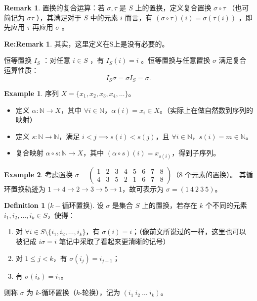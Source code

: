 \documentclass[oneside]{book}
\theoremstyle{definition}
\newtheorem{example}{Example}[section]
\newtheorem{definition}{Definition}[section]
\newtheorem{remark}{Remark}[section]
\newtheorem{reremark}{Re:Remark}[section]
\begin{document}
	\begin{remark}
		置换的复合运算：若 \( \sigma, \tau \) 是 \( S \) 上的置换，定义复合置换 \( \sigma \circ \tau \) （也可简记为 \( \sigma\tau \) ），其满足对于 \( S \) 中的元素 \( i \) 而言，有 \( (\sigma \circ \tau)(i) = \sigma(\tau(i)) \) ，即先应用 \( \tau \) 再应用 \( \sigma \)  。  
		
	\begin{reremark}
		其实，这里定义在S上是没有必要的。
	\end{reremark}
		恒等置换 \( I_S \) ：对任意 \( i \in S \) ，有 \( I_S(i) = i \) 。恒等置换与任意置换 \( \sigma \) 满足复合运算性质：  
		\[
		I_S \sigma = \sigma I_S = \sigma.
		\]  
	\end{remark}
	\begin{example}
		序列 \( X = \{ x_1, x_2, x_3, x_4, \dots \} \)。
		\begin{itemize}
			\item 定义 \( \alpha: \mathbb{N} \to X \)，其中 \( \forall i \in \mathbb{N} \)，\( \alpha(i) = x_i \in X \)。（实际上在做自然数到序列的映射）
			\item 定义 \( s: \mathbb{N} \to \mathbb{N} \)，满足 \( i < j \implies s(i) < s(j) \)，且 \( \forall i \in \mathbb{N} \)，\( s(i) = m \in \mathbb{N} \)。
			\item 复合映射 \( \alpha \circ s: \mathbb{N} \to X \)，其中 \( (\alpha \circ s)(i) = x_{s(i)} \)，得到子序列。
		\end{itemize}
	\end{example}
	
	\begin{example}
		考虑置换 \( \sigma = \begin{pmatrix} 1 & 2 & 3 & 4 & 5 & 6 & 7 & 8 \\ 4 & 3 & 5 & 2 & 1 & 6 & 7 & 8 \end{pmatrix} \)（8 个元素的置换）。
		其循环置换轨迹为 \( 1 \to 4 \to 2 \to 3 \to 5 \to 1 \)，故可表示为 \( \sigma = (1\ 4\ 2\ 3\ 5) \)。
	\end{example}
	
	\begin{definition}[$k-$循环置换]
		设 \( \sigma \) 是集合 \( S \) 上的置换，若存在 \( k \) 个不同的元素 \( i_1, i_2, \dots, i_k \in S \)，使得：
		\begin{enumerate}
			\item 对 \( \forall i \in S \setminus \{ i_1, i_2, \dots, i_k \} \)，有 \( \sigma(i) = i \)；（像前文所说过的一样，这里也可以被记成 \( i\sigma = i \) 笔记中采取了看起来更清晰的记号）
			\item 对 \( 1 \leq j < k \)，有 \( \sigma(i_j) = i_{j+1} \)；
			\item 有 \( \sigma(i_k) = i_1 \)。
		\end{enumerate}
		
		
		
		则称 \( \sigma \) 为 \( k \)-循环置换（\( k \)-轮换），记为 \( (i_1\ i_2\ \dots\ i_k) \)。
	\end{definition}
	
\end{document}
